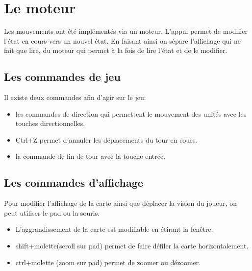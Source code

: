 \newpage





\section{Le moteur}

Les mouvements ont été implémentés via un moteur. L'appui permet de modifier l'état en cours vers un nouvel état. En faisant ainsi on sépare l'affichage qui ne fait que lire, du moteur qui permet à la fois de lire l'état et de le modifier.


\subsection{Les commandes de jeu}

Il existe deux commandes afin d'agir sur le jeu: 
\begin{itemize}
    \item les commandes de direction qui permettent le mouvement des unités avec les touches directionnelles.
    \item Ctrl+Z permet d'annuler les déplacements du tour en cours.
    \item la commande de fin de tour avec la touche entrée.
\end{itemize}

\subsection{Les commandes d'affichage}
Pour modifier l'affichage de la carte ainsi que déplacer la vision du joueur, on peut utiliser le pad ou la souris.
\begin{itemize}
    \item L'aggrandissement de la carte est modifiable en étirant la fenêtre.
    \item shift+molette(scroll sur pad) permet de faire défiler la carte horizontalement.
    \item ctrl+molette (zoom sur pad) permet de zoomer ou dézoomer.
\end{itemize}


\newpage

\phantom{Texte invisible parce que j'ai pas trouvé d'autre méthode pour mettre le tableau à la ligne.}

